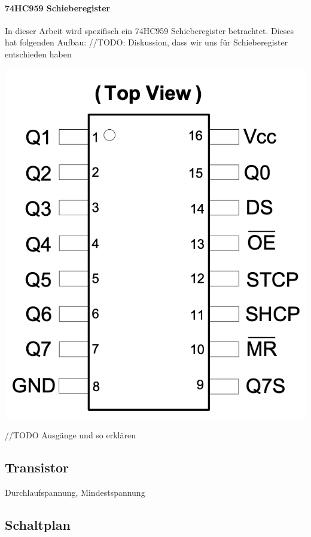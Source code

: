 \paragraph{74HC959 Schieberegister}
In dieser Arbeit wird spezifisch ein 74HC959 Schieberegister betrachtet. Dieses hat folgenden Aufbau:
//TODO: Diskussion, dass wir uns für Schieberegister entschieden haben \newline
\begin{minipage}{0.4\textwidth}
	\includegraphics [width=\textwidth] {img/Schieberegister}
\end{minipage}
\begin{minipage}{0.6\textwidth}
	//TODO Ausgänge und so erklären
\end{minipage}
\newline


\subsection{Transistor}
Durchlaufspannung, Mindestspannung

\subsection{Schaltplan}

